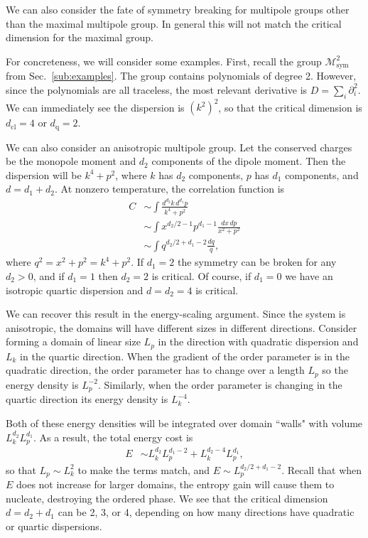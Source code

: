 \documentclass[prb,aps,twocolumn, amsfonts,amsmath,amssymb,nofootinbib,superscriptaddress]{revtex4-2}
\newcommand{\nn}{\nonumber\\}
\newcommand{\cl}{\text{cl}}
\newcommand{\q}{\text{q}}
\begin{document}
We can also consider the fate of symmetry breaking for multipole groups other than the maximal multipole group. In general this will not match the critical dimension for the maximal group. 

For concreteness, we will consider some examples. First, recall the group $\mathcal{M}^2_\text{sym}$ from Sec.~\ref{sub:examples}. The group contains polynomials of degree 2. However, since the polynomials are all traceless, the most relevant derivative is $D = \sum_i \partial^2_i$.  We can immediately see the dispersion is $(k^2)^2$, so that the critical dimension is $d_\cl = 4$ or $d_\q = 2$.

We can also consider an anisotropic multipole group. 
Let the conserved charges be the monopole moment and $d_2$ components of the dipole moment. Then the dispersion will be $k^4 + p^2$, where $k$ has $d_2$ components, $p$ has $d_1$ components, and $d = d_1+d_2$. At nonzero temperature, the correlation function is
\begin{align}
C &\sim \int \frac{d^{d_2} k \, d^{d_1} p}{k^4 + p^2}\nn
&\sim \int x^{d_2/2 -1} p^{d_1-1} \frac{dx\, dp}{x^2 +p^2} \nn
&\sim \int q^{d_2/2 + d_1 - 2}\frac{dq}{q},
\end{align}
where $q^2 = x^2 + p^2 = k^4 + p^2$. 
If $d_1=2$ the symmetry can be broken for any $d_2>0$, and if $d_1=1$ then $d_2=2$  is critical. Of course, if $d_1=0$ we have an isotropic quartic dispersion and $d=d_2=4$ is critical. 

We can recover this result in  the energy-scaling argument. Since the system is anisotropic, the domains will have different sizes in different directions. Consider forming a domain of linear size $L_p$ in the  direction with quadratic dispersion and $L_k$ in the quartic direction. When the gradient of the order parameter is in the quadratic direction, the order parameter has to change over a length $L_p$ so the energy density is $L_p^{-2}$. Similarly, when the order parameter is changing in the quartic direction its energy density is $L_k^{-4}$. 

Both of these energy densities will be integrated over domain ``walls" with volume $L_k^{d_2} L_p^{d_1}$.
As a result, the total energy cost is
\begin{align}
E &\sim L_k^{d_2} L_p^{d_1-2} + L_k^{d_2-4} L_p^{d_1},
\end{align}
so that $L_p \sim L_k^2$ to make the terms match, and $E\sim L_p^{d_2/2+d_1-2}$. Recall that when $E$ does not increase for larger domains, the entropy gain will cause them to nucleate, destroying the ordered phase.
We see that the critical dimension $d= d_2 + d_1$ can be 2, 3, or 4, depending on how many directions have quadratic or quartic dispersions.
\end{document}
